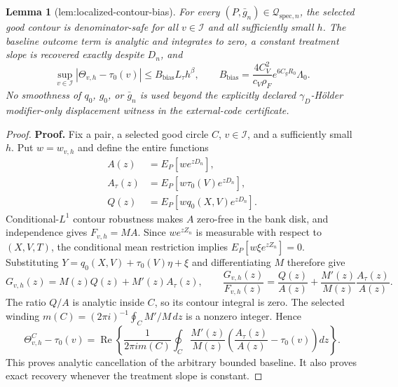 \documentclass{article}
\newtheorem{lemma}{Lemma}
\begin{document}
\begin{lemma}[lem:localized-contour-bias]\label{lem:localized-contour-bias}
For every \((P,\bar g_n)\in\mathcal Q_{\mathrm{spec},n}\), the selected good contour is denominator-safe for all \(v\in\mathcal I\) and all sufficiently small \(h\). The baseline outcome term is analytic and integrates to zero, a constant treatment slope is recovered exactly despite \(D_n\), and
\[
 \sup_{v\in\mathcal I}|\Theta_{v,h}-\tau_0(v)|
 \le B_{\mathrm{bias}}L_\tau h^\beta,
 \qquad
 B_{\mathrm{bias}}=\frac{4C_V^2}{c_V\rho_F}
 e^{6C_gR_0}\Lambda_0.
\]
No smoothness of \(q_0\), \(g_0\), or \(\bar g_n\) is used beyond the explicitly declared \(\gamma_D\)-H\"older modifier-only displacement witness in the external-code certificate.
\end{lemma}
\begin{proof}
\textbf{Proof.}
Fix a pair, a selected good circle \(C\), \(v\in\mathcal I\), and a sufficiently small \(h\).  Put \(w=w_{v,h}\) and define the entire functions
\[
 \begin{aligned}
 A(z)&=E_P[we^{zD_n}],\\
 A_\tau(z)&=E_P[w\tau_0(V)e^{zD_n}],\\
 Q(z)&=E_P[wq_0(X,V)e^{zD_n}].
 \end{aligned} \tag{1}
\]
Conditional-\(L^1\) contour robustness makes \(A\) zero-free in the bank disk, and independence gives \(F_{v,h}=MA\).  Since \(we^{zZ_n}\) is measurable with respect to \((X,V,T)\), the conditional mean restriction implies
\(E_P[w\xi e^{zZ_n}]=0\).  Substituting
\(Y=q_0(X,V)+\tau_0(V)\eta+\xi\) and differentiating \(M\) therefore give
\[
 G_{v,h}(z)=M(z)Q(z)+M'(z)A_\tau(z),
 \qquad
 \frac{G_{v,h}(z)}{F_{v,h}(z)}
 =\frac{Q(z)}{A(z)}+\frac{M'(z)}{M(z)}\frac{A_\tau(z)}{A(z)}. \tag{2}
\]
The ratio \(Q/A\) is analytic inside \(C\), so its contour integral is zero.  The selected winding
\(m(C)=(2\pi i)^{-1}\oint_C M'/M\,dz\) is a nonzero integer.  Hence
\[
 \Theta^C_{v,h}-\tau_0(v)
 =\operatorname{Re}\left\{
 \frac1{2\pi i m(C)}\oint_C\frac{M'(z)}{M(z)}
 \left(\frac{A_\tau(z)}{A(z)}-\tau_0(v)\right)dz
 \right\}. \tag{3}
\]
This proves analytic cancellation of the arbitrary bounded baseline.  It also proves exact recovery whenever the treatment slope is constant.


\end{proof}
\end{document}
